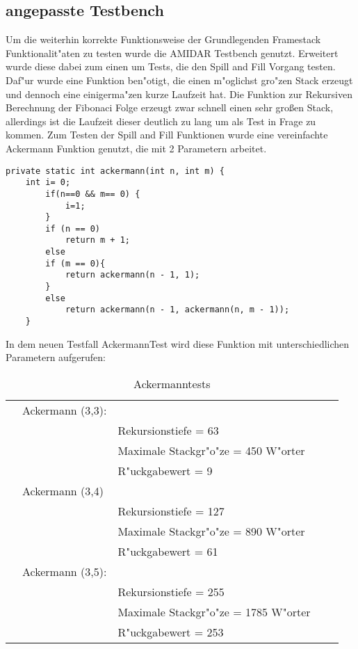 \subsection{angepasste Testbench}
Um die weiterhin korrekte Funktionsweise der Grundlegenden Framestack Funktionalit"aten zu testen wurde die AMIDAR Testbench genutzt. Erweitert wurde diese dabei zum einen um Tests, die den Spill and Fill Vorgang testen. Daf"ur wurde eine Funktion ben"otigt, die einen m"oglichst gro"zen Stack erzeugt und dennoch eine einigerma"zen kurze Laufzeit hat. Die Funktion zur Rekursiven Berechnung der Fibonaci Folge erzeugt zwar schnell einen sehr großen Stack, allerdings ist die Laufzeit dieser deutlich zu lang um als Test in Frage zu kommen. Zum  Testen der Spill and Fill Funktionen wurde eine vereinfachte Ackermann Funktion genutzt, die mit 2 Parametern arbeitet.\\

\begin{minipage}{\linewidth}
\begin{lstlisting}
private static int ackermann(int n, int m) {
	int i= 0;	
		if(n==0 && m== 0) {
			i=1;			
		}
		if (n == 0)
			return m + 1;
		else
		if (m == 0){			
			return ackermann(n - 1, 1);
		}
		else
			return ackermann(n - 1, ackermann(n, m - 1));
	}
\end{lstlisting}
\end{minipage}
In dem neuen Testfall AckermannTest wird diese Funktion mit unterschiedlichen Parametern aufgerufen: \

\begin{table}[]
\centering
\caption{Ackermanntests}
\label{my-label}
\begin{tabular}{lllll}
 & Ackermann (3,3):  & \\
 &  & Rekursionstiefe 		= 63 \\
 &  & Maximale Stackgr"o"ze = 450 W"orter  \\
 &  & 	R"uckgabewert 			= 9 \\
 & Ackermann (3,4)  &\\
 &  & Rekursionstiefe			= 127 \\
 &	& Maximale Stackgr"o"ze = 890 W"orter\\
 &  & R"uckgabewert			= 61\\
 & Ackermann (3,5): &\\
 & & Rekursionstiefe			= 255\\
 & & Maximale Stackgr"o"ze = 1785 W"orter\\
 & &	R"uckgabewert			= 253
\end{tabular}
\end{table}




